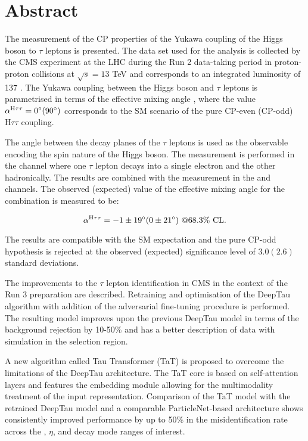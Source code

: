 \thispagestyle{empty}
\vspace{-3cm}
\section*{\centering Abstract}

\noindent

The measurement of the CP properties of the Yukawa coupling of the Higgs boson to $\tau$ leptons is presented. The data set used for the analysis is collected by the CMS experiment at the LHC during the Run 2 data-taking period in proton-proton collisions at $\sqrt{s}=13$ TeV and corresponds to an integrated luminosity of 137 \ifb. The Yukawa coupling between the Higgs boson and $\tau$ leptons is parametrised in terms of the effective mixing angle \mixa, where the value $\alpha^{\text{H}\tau\tau} = 0^\circ (90^\circ)$ corresponds to the SM scenario of the pure CP-even (CP-odd) $\text{H}\tau\tau$ coupling. 

The angle between the decay planes of the $\tau$ leptons is used as the observable encoding the spin nature of the Higgs boson. The measurement is performed in the \et channel where one $\tau$ lepton decays into a single electron and the other hadronically. The results are combined with the measurement in the \mt and \tata channels. The observed (expected) value of the effective mixing angle for the combination is measured to be:

\begin{equation}
    \alpha^{\text{H}\tau\tau} = -1 \pm 19^\circ (0 \pm 21^\circ) ~@68.3\% \text{ CL}.
\end{equation}

The results are compatible with the SM expectation and the pure CP-odd hypothesis is rejected at the observed (expected) significance level of $3.0 (2.6)$ standard deviations.

The improvements to the $\tau$ lepton identification in CMS in the context of the Run 3 preparation are described. Retraining and optimisation of the DeepTau algorithm with addition of the adversarial fine-tuning procedure is performed. The resulting model improves upon the previous DeepTau model in terms of the background rejection by 10-50\% and has a better description of data with simulation in the \htt selection region. 

A new algorithm called Tau Transformer (TaT) is proposed to overcome the limitations of the DeepTau architecture. The TaT core is based on self-attention layers and features the embedding module allowing for the multimodality treatment of the input representation. Comparison of the TaT model with the retrained DeepTau model and a comparable ParticleNet-based architecture shows consistently improved performance by up to 50\% in the misidentification rate across the \pt, $\eta$, and decay mode ranges of interest.   

\newpage
\thispagestyle{empty}
\mbox{}

